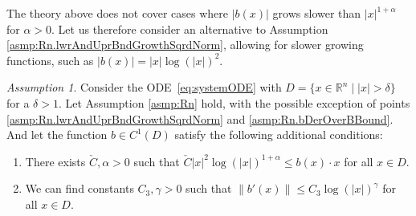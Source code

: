 \documentclass[a4paper, oneside, reqno]{amsart}
\newcommand{\abs}[1]{\left\lvert#1\right\rvert}
\newcommand{\norm}[1]{\left\|#1\right\|}
\newcommand{\R}{\mathbb{R}}
\theoremstyle{remark}
\newtheorem{assumption}{Assumption}
\renewcommand{\theassumption}{\Alph{assumption}}
\begin{document}
The theory above does not cover cases where \(\abs{b(x)}\) grows slower than \(\abs{x}^{1+\alpha}\) for \(\alpha >0\). Let us therefore consider an alternative to Assumption \ref{asmp:Rn.lwrAndUprBndGrowthSqrdNorm}, allowing for slower growing functions, such as \(\abs{b(x)} = \abs{x}\log(\abs{x})^{2}\). 

\begingroup
\renewcommand{\theassumption}{B\textsuperscript{\ensuremath\prime}}
\begin{assumption}
    \label{asmp:RnAlt}
    Consider the ODE~\eqref{eq:systemODE} with $D = \{x \in \R^n \mid |x| > \delta\}$ for a \(\delta > 1\). Let Assumption \ref{asmp:Rn} hold, with the possible exception of points \ref{asmp:Rn.lwrAndUprBndGrowthSqrdNorm} and \ref{asmp:Rn.bDerOverBBound}.
    And let the function \(b\in C^1(D)\) satisfy the following additional conditions:
    \begin{enumerate}[label=\arabic*)]
        \item There exists \(\check{C}, \alpha > 0\) such that \(\check{C}\abs{x}^2\log(\abs{x})^{1+\alpha} \leq b(x)\cdot x\) for all \(x \in D\). \\
        \item We can find constants \(C_3, \gamma >0\) such that \(\norm{b'(x)} \leq C_3\log(\abs{x})^{\gamma}\) for all \(x \in D\).
    \end{enumerate}
\end{assumption}
\addtocounter{assumption}{-1}
\endgroup
\end{document}
